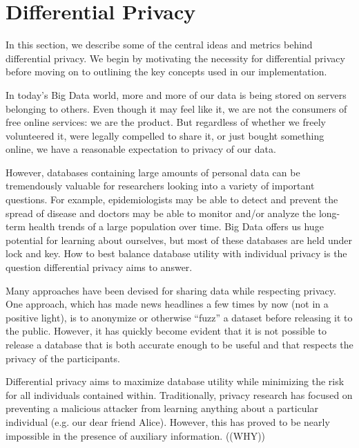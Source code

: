\documentclass[12pt]{article}
\begin{document}
\section{Differential Privacy}\label{sec:differential_privacy}

In this section, we describe some of the central ideas and metrics behind differential privacy.
We begin by motivating the necessity for differential privacy before moving on to outlining the key concepts used in our implementation.


In today's Big Data world, more and more of our data is being stored on servers belonging to others.
Even though it may feel like it, we are not the consumers of free online services: we are the product.
But regardless of whether we freely volunteered it, were legally compelled to share it, or just bought something online, we have a reasonable expectation to privacy of our data.

However, databases containing large amounts of personal data can be tremendously valuable for researchers looking into a variety of important questions.
For example, epidemiologists may be able to detect and prevent the spread of disease and doctors may be able to monitor and/or analyze the long-term health trends of a large population over time.
Big Data offers us huge potential for learning about ourselves, but most of these databases are held under lock and key.
How to best balance database utility with individual privacy is the question differential privacy aims to answer.

Many approaches have been devised for sharing data while respecting privacy.
One approach, which has made news headlines a few times by now (not in a positive light), is to anonymize or otherwise ``fuzz'' a dataset before releasing it to the public.
However, it has quickly become evident that it is not possible to release a database that is both accurate enough to be useful and that respects the privacy of the participants\cite{journals/cacm/Dwork11}.

Differential privacy aims to maximize database utility while minimizing the risk for all individuals contained within.
Traditionally, privacy research has focused on preventing a malicious attacker from learning anything about a particular individual (e.g. our dear friend Alice).
However, this has proved to be nearly impossible in the presence of auxiliary information. ((WHY))
\end{document}
